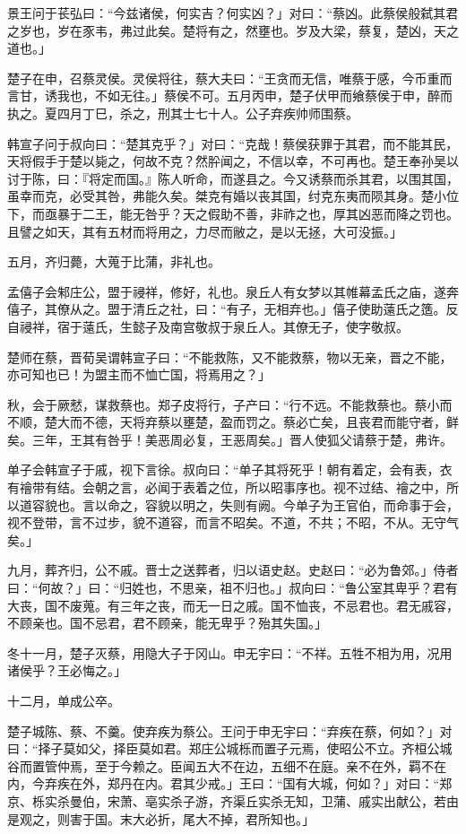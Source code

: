\documentclass[]{article}
\begin{document}
景王问于苌弘曰：``今兹诸侯，何实吉？何实凶？」对曰：``蔡凶。此蔡侯般弑其君之岁也，岁在豕韦，弗过此矣。楚将有之，然壅也。岁及大梁，蔡复，楚凶，天之道也。」

楚子在申，召蔡灵侯。灵侯将往，蔡大夫曰：``王贪而无信，唯蔡于感，今币重而言甘，诱我也，不如无往。」蔡侯不可。五月丙申，楚子伏甲而飨蔡侯于申，醉而执之。夏四月丁巳，杀之，刑其士七十人。公子弃疾帅师围蔡。

韩宣子问于叔向曰：``楚其克乎？」对曰：``克哉！蔡侯获罪于其君，而不能其民，天将假手于楚以毙之，何故不克？然肸闻之，不信以幸，不可再也。楚王奉孙吴以讨于陈，曰：『将定而国。』陈人听命，而遂县之。今又诱蔡而杀其君，以围其国，虽幸而克，必受其咎，弗能久矣。桀克有婚以丧其国，纣克东夷而陨其身。楚小位下，而亟暴于二王，能无咎乎？天之假助不善，非祚之也，厚其凶恶而降之罚也。且譬之如天，其有五材而将用之，力尽而敝之，是以无拯，大可没振。」

五月，齐归薨，大蒐于比蒲，非礼也。

孟僖子会邾庄公，盟于祲祥，修好，礼也。泉丘人有女梦以其帷幕孟氏之庙，遂奔僖子，其僚从之。盟于清丘之社，曰：``有子，无相弃也。」僖子使助薳氏之簉。反自祲祥，宿于薳氏，生懿子及南宫敬叔于泉丘人。其僚无子，使字敬叔。

楚师在蔡，晋荀吴谓韩宣子曰：``不能救陈，又不能救蔡，物以无亲，晋之不能，亦可知也已！为盟主而不恤亡国，将焉用之？」

秋，会于厥憖，谋救蔡也。郑子皮将行，子产曰：``行不远。不能救蔡也。蔡小而不顺，楚大而不德，天将弃蔡以壅楚，盈而罚之。蔡必亡矣，且丧君而能守者，鲜矣。三年，王其有咎乎！美恶周必复，王恶周矣。」晋人使狐父请蔡于楚，弗许。

单子会韩宣子于戚，视下言徐。叔向曰：``单子其将死乎！朝有着定，会有表，衣有禬带有结。会朝之言，必闻于表着之位，所以昭事序也。视不过结、禬之中，所以道容貌也。言以命之，容貌以明之，失则有阙。今单子为王官伯，而命事于会，视不登带，言不过步，貌不道容，而言不昭矣。不道，不共；不昭，不从。无守气矣。」

九月，葬齐归，公不戚。晋士之送葬者，归以语史赵。史赵曰：``必为鲁郊。」侍者曰：``何故？」曰：``归姓也，不思亲，祖不归也。」叔向曰：``鲁公室其卑乎？君有大丧，国不废蒐。有三年之丧，而无一日之戚。国不恤丧，不忌君也。君无戚容，不顾亲也。国不忌君，君不顾亲，能无卑乎？殆其失国。」

冬十一月，楚子灭蔡，用隐大子于冈山。申无宇曰：``不祥。五牲不相为用，况用诸侯乎？王必悔之。」

十二月，单成公卒。

楚子城陈、蔡、不羹。使弃疾为蔡公。王问于申无宇曰：``弃疾在蔡，何如？」对曰：``择子莫如父，择臣莫如君。郑庄公城栎而置子元焉，使昭公不立。齐桓公城谷而置管仲焉，至于今赖之。臣闻五大不在边，五细不在庭。亲不在外，羁不在内，今弃疾在外，郑丹在内。君其少戒。」王曰：``国有大城，何如？」对曰：``郑京、栎实杀曼伯，宋萧、亳实杀子游，齐渠丘实杀无知，卫蒲、戚实出献公，若由是观之，则害于国。末大必折，尾大不掉，君所知也。」
\end{document}
